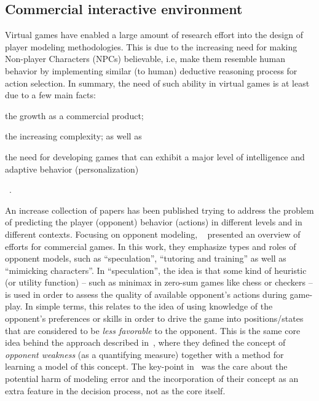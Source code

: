 \subsection{Commercial interactive environment}

Virtual games have enabled a large amount of research effort into the design of player modeling methodologies. This is due to the increasing need for making Non-player Characters (NPCs) believable, i.e, make them resemble human behavior by implementing similar (to human) deductive reasoning process for action selection.  In summary, the need of such ability in virtual games is at least due to a few main facts: \begin{inparaenum}\item the growth as a commercial product; \item the increasing complexity; as well as \item the need for developing games that can exhibit a major level of intelligence and adaptive behavior (personalization)\end{inparaenum}~\cite{bakkes_personalised_2012}. 

An increase collection of papers has been published trying to address the problem of predicting the player (opponent) behavior (actions) in different levels and in different contexts. Focusing on opponent modeling, ~\cite{herik_opponent_2005} presented an overview of efforts for commercial games. In this work, they emphasize types and roles of opponent models, such as ``speculation'', ``tutoring and training'' as well as ``mimicking characters''. In ``speculation'', the idea is that some kind of heuristic (or utility function) -- such as minimax in zero-sum games like chess or checkers -- is used in order to assess the quality of available opponent's actions during game-play. In simple terms, this relates to the idea of using knowledge of the opponent's preferences or skills in order to drive the game into positions/states that are considered to be \textit{less favorable} to the opponent. This is the same core idea behind the approach described in~\cite{markovitch_learning_2005}, where they defined the concept of \textit{opponent weakness} (as a quantifying measure) together with a method for learning a model of this concept. The key-point in~\cite{markovitch_learning_2005} was the care about the potential harm of modeling error and the incorporation of their concept as an extra feature in the decision process, not as the core itself.

